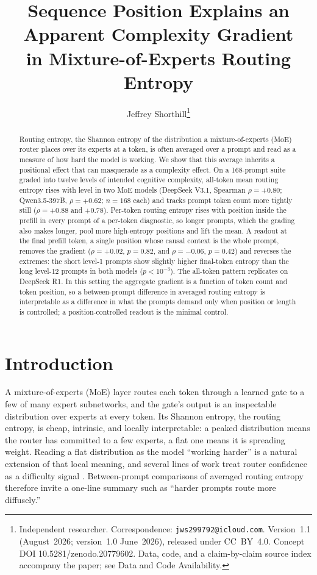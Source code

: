 \documentclass[10pt,twocolumn]{article}
\title{\textbf{Sequence Position Explains an Apparent Complexity Gradient\\
in Mixture-of-Experts Routing Entropy}}
\author{Jeffrey Shorthill\thanks{Independent researcher. Correspondence:
\texttt{jws299792@icloud.com}. Version~1.1 (August~2026; version~1.0 June~2026),
released under CC~BY~4.0. Concept DOI 10.5281/zenodo.20779602. Data, code, and a
claim-by-claim source index accompany the paper; see Data and Code Availability.}}
\date{}
\begin{document}
\maketitle

\begin{abstract}
\noindent
Routing entropy, the Shannon entropy of the distribution a mixture-of-experts
(MoE) router places over its experts at a token, is often averaged over a
prompt and read as a measure of how hard the model is working. We show that
this average inherits a positional effect that can masquerade as a
complexity effect. On a 168-prompt suite graded into twelve levels of
intended cognitive complexity, all-token mean routing entropy rises with
level in two MoE models (DeepSeek V3.1, Spearman $\rho=+0.80$;
Qwen3.5-397B, $\rho=+0.62$; $n=168$ each) and tracks prompt token count more
tightly still ($\rho=+0.88$ and $+0.78$). Per-token routing entropy rises
with position inside the prefill in every prompt of a per-token diagnostic,
so longer prompts, which the grading also makes longer, pool more
high-entropy positions and lift the mean. A readout at the final prefill
token, a single position whose causal context is the whole prompt, removes
the gradient ($\rho=+0.02$, $p=0.82$, and $\rho=-0.06$, $p=0.42$) and
reverses the extremes: the short level-1 prompts show slightly higher
final-token entropy than the long level-12 prompts in both models
($p<10^{-3}$). The all-token pattern replicates on DeepSeek R1. In this
setting the aggregate gradient is a function of token count and token
position, so a between-prompt difference in averaged routing entropy is interpretable
as a difference in what the prompts demand only when position or length is
controlled; a position-controlled readout is the minimal control.
\end{abstract}

\section{Introduction}
\label{sec:intro}

A mixture-of-experts (MoE) layer routes each token through a learned gate to
a few of many expert subnetworks, and the gate's output is an inspectable
distribution over experts at every token. Its Shannon entropy, the routing
entropy, is cheap, intrinsic, and locally interpretable: a peaked
distribution means the router has committed to a few experts, a flat one
means it is spreading weight. Reading a flat distribution as the model
``working harder'' is a natural extension of that local meaning, and
several lines of work treat router confidence as a difficulty signal
\citep{huang2024harder,raposo2024mixture}. Between-prompt comparisons of
averaged routing entropy therefore invite a one-line summary such as
``harder prompts route more diffusely.''
\end{document}
